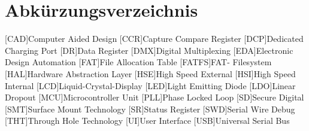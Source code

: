 \section*{Abkürzungsverzeichnis}
\begin{acronym}[main]
	[CAD]{Computer Aided Design}
	[CCR]{Capture Compare Register}
	[DCP]{Dedicated Charging Port}
	[DR]{Data Register}
	[DMX]{Digital Multiplexing}
	[EDA]{Electronic Design Automation}
	[FAT]{File Allocation Table}
	[FATFS]{FAT- Filesystem}
	[HAL]{Hardware Abstraction Layer}
	[HSE]{High Speed External}
	[HSI]{High Speed Internal}
	[LCD]{Liquid-Crystal-Display}
	[LED]{Light Emitting Diode}
	[LDO]{Linear Dropout}
	[MCU]{Microcontroller Unit}
	[PLL]{Phase Locked Loop}
	[SD]{Secure Digital}
	[SMT]{Surface Mount Technology}
	[SR]{Status Register}
	[SWD]{Serial Wire Debug}
	[THT]{Through Hole Technology}
	[UI]{User Interface}
	[USB]{Universal Serial Bus}
\end{acronym}